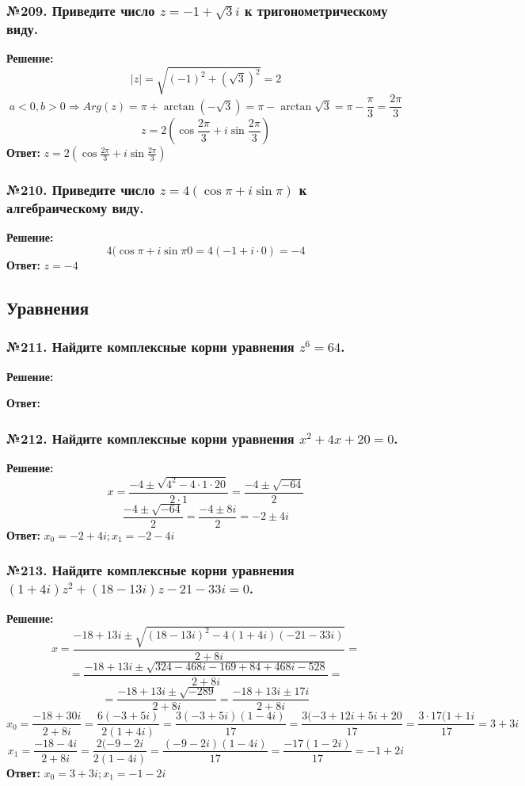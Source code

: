 \documentclass[a4paper]{article}
\begin{document}
\subsubsection*{№209. Приведите число $z=-1+\sqrt{3}i$ к тригонометрическому виду.}
\textbf{Решение:}
\[|z|=\sqrt{(-1)^2+(\sqrt{3})^2}=2\]
\[a<0, b>0 \Rightarrow Arg(z) = \pi + \arctan(-\sqrt{3})=\pi-\arctan\sqrt{3}=\pi-\frac{\pi}{3}=\frac{2\pi}{3}\]
\[z=2(\cos{\frac{2\pi}{3}}+i\sin{\frac{2\pi}{3}})\]
\textbf{Ответ:} $z=2(\cos{\frac{2\pi}{3}}+i\sin{\frac{2\pi}{3}})$

\subsubsection*{№210. Приведите число $z=4(\cos{\pi}+i\sin{\pi})$ к алгебраическому виду.}
\textbf{Решение:}
\[4(\cos{\pi}+i\sin{\pi}0=4(-1+i\cdot0)=-4\] 
\textbf{Ответ:} $z=-4$

\subsection*{Уравнения}
\subsubsection*{№211. Найдите комплексные корни уравнения $z^6=64$.}
\textbf{Решение:} \par 

\textbf{Ответ:} 

\subsubsection*{№212. Найдите комплексные корни уравнения $x^2+4x+20=0$.}
\textbf{Решение:}
\[x=\frac{-4\pm\sqrt{4^2-4\cdot1\cdot20}}{2\cdot1}=\frac{-4\pm\sqrt{-64}}{2}\]
\[\frac{-4\pm\sqrt{-64}}{2}=\frac{-4\pm8i}{2}=-2\pm4i\]
\textbf{Ответ:} $x_0=-2+4i; x_1=-2-4i$

\subsubsection*{№213. Найдите комплексные корни уравнения $(1+4i)z^2+(18-13i)z-21-33i=0$.}
\textbf{Решение:}
\[x=\frac{-18+13i\pm\sqrt{(18-13i)^2-4(1+4i)(-21-33i)}}{2+8i}=\]
\[=\frac{-18+13i\pm\sqrt{324-468i-169+84+468i-528}}{2+8i}=\]
\[=\frac{-18+13i\pm\sqrt{-289}}{2+8i}=\frac{-18+13i\pm17i}{2+8i}\]
\[x_0=\frac{-18+30i}{2+8i}=\frac{6(-3+5i)}{2(1+4i)}=\frac{3(-3+5i)(1-4i)}{17}=\frac{3(-3+12i+5i+20}{17}=\frac{3\cdot17(1+1i}{17}=3+3i\]
\[x_1=\frac{-18-4i}{2+8i}=\frac{2(-9-2i}{2(1-4i)}=\frac{(-9-2i)(1-4i)}{17}=\frac{-17(1-2i)}{17}=-1+2i\]
\textbf{Ответ:} $\displaystyle x_0=3+3i; x_1=-1-2i$
\end{document}
